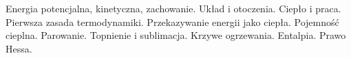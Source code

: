Energia potencjalna, kinetyczna, zachowanie.
Układ i otoczenia.
Ciepło i praca.
Pierwsza zasada termodynamiki.
Przekazywanie energii jako ciepła.
Pojemność cieplna.
Parowanie.
Topnienie i sublimacja.
Krzywe ogrzewania.
Entalpia.
Prawo Hessa.